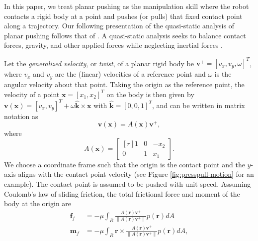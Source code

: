 \documentclass[conference]{IEEEtran}
\DeclareMathOperator{\sign}{\text{sgn}}
\newcommand{\EH}[1]{{\color{blue} {Eric: {#1}}  }}
\begin{document}
In this paper, we treat planar pushing as the manipulation skill where
the robot contacts a rigid body at a point and pushes (or pulls) that
fixed contact point along a trajectory.
Our following presentation of the quasi-static analysis of planar
pushing follows that of \cite{alexander1993bounds, Mason}. A
quasi-static analysis seeks to balance contact forces, gravity, and
other applied forces while neglecting inertial forces \cite{Mason}.

Let the \textit{generalized velocity}, or \textit{twist}, of a planar
rigid body be $\mathbf{v}^+ = [v_x, v_y, \omega]^T$, where $v_x$ and
$v_y$ are the (linear) velocities of a reference point and $\omega$ is
the angular velocity about that point. Taking the origin as the
reference point, the velocity of a point $\mathbf{x} = [x_1,x_2]^T$ on
the body is then given by
$\mathbf{v}(\mathbf{x}) = [v_x, v_y]^T + \omega\hat{\mathbf{k}} \times
\mathbf{x}$
with $\hat{\mathbf{k}} = [0,0,1]^T$, and can be written in matrix
notation as
\begin{equation} \label{eq:generalized-velocity}
\mathbf{v}(\mathbf{x}) = A(\mathbf{x})\mathbf{v}^+,
\end{equation}
where
\begin{equation}
  A(\mathbf{x}) = 
  \begin{bmatrix*}[r]
    1 & 0 & -x_2 \\
    0 & 1 &  x_1
  \end{bmatrix*}.
\end{equation}
We choose a coordinate frame such that the origin is the contact point
and the $y$-axis aligns with the contact point velocity (see Figure
\ref{fig:presspull-motion} for an example). The contact point is
assumed to be pushed with unit speed. Assuming Coulomb's law of
sliding friction, the total frictional force and moment of the body at
the origin are
\begin{align}
  \mathbf{f}_f &= -\mu\int_{R}\frac{A(\mathbf{r})\mathbf{v}^+}{\lVert A(\mathbf{r})\mathbf{v}^+ \rVert} p(\mathbf{r}) dA \label{eq:force-at-contact} \\
  \mathbf{m}_f &= -\mu\int_{R}\mathbf{r}\times\frac{A(\mathbf{r})\mathbf{v}^+}{\lVert A(\mathbf{r})\mathbf{v}^+ \rVert} p(\mathbf{r}) dA, \label{eq:moment-at-contact}
\end{align}
\end{document}
